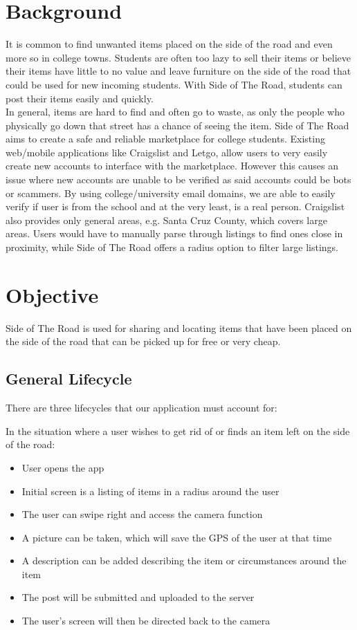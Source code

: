 \documentclass[sigconf]{acmart}
\begin{document}
\section{Background}
It is common to find unwanted items placed on the side of the road and even more so in college towns. Students are often too lazy to sell their items or believe their items have little to no value and leave furniture on the side of the road that could be used for new incoming students. With Side of The Road, students can post their items easily and quickly. \\
In general, items are hard to find and often go to waste, as only the people who physically go down that street has a chance of seeing the item. Side of The Road aims to create a safe and reliable marketplace for college students. Existing  web/mobile applications like Craigslist and Letgo, allow users to very easily create new accounts to interface with the marketplace. However this causes an issue where new accounts are unable to be verified as said accounts could be bots or scammers. By using college/university email domains, we are able to easily verify if user is from the school and at the very least, is a real person. Craigslist also provides only general areas, e.g. Santa Cruz County, which covers large areas. Users would have to manually parse through listings to find ones close in proximity, while Side of The Road offers a radius option to filter large listings.

\section{Objective}
Side of The Road is used for sharing and locating items that have been placed on the side of the road that can be picked up for free or very cheap.

\subsection{General Lifecycle}

There are three lifecycles that our application must account for:

\noindent In the situation where a user wishes to get rid of or finds an item left on the side of the road: 
\begin{itemize}
	\item User opens the app
	\item Initial screen is a listing of items in a radius around the user
	\item The user can swipe right and access the camera function
	\item A picture can be taken, which will save the GPS of the user at that time
	\item A description can be added describing the item or circumstances around the item
	\item The post will be submitted and uploaded to the server
	\item The user's screen will then be directed back to the camera
\end{itemize}
\end{document}
